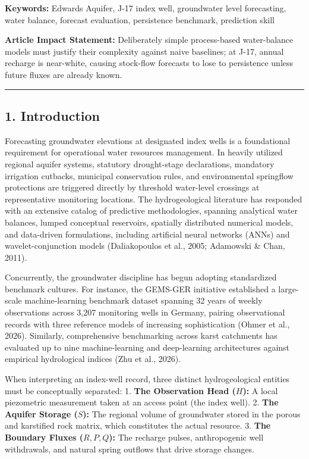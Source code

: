 \documentclass[11pt]{article}
\begin{document}
\textbf{Keywords:} Edwards Aquifer, J-17 index well, groundwater level
forecasting, water balance, forecast evaluation, persistence benchmark,
prediction skill

\textbf{Article Impact Statement:} Deliberately simple process-based
water-balance models must justify their complexity against naive
baselines; at J-17, annual recharge is near-white, causing stock-flow
forecasts to lose to persistence unless future fluxes are already known.

\begin{center}\rule{0.5\linewidth}{0.5pt}\end{center}

\subsection{1. Introduction}\label{introduction}

Forecasting groundwater elevations at designated index wells is a
foundational requirement for operational water resources management. In
heavily utilized regional aquifer systems, statutory drought-stage
declarations, mandatory irrigation cutbacks, municipal conservation
rules, and environmental springflow protections are triggered directly
by threshold water-level crossings at representative monitoring
locations. The hydrogeological literature has responded with an
extensive catalog of predictive methodologies, spanning analytical water
balances, lumped conceptual reservoirs, spatially distributed numerical
models, and data-driven formulations, including artificial neural
networks (ANNs) and wavelet-conjunction models (Daliakopoulos et al.,
2005; Adamowski \& Chan, 2011).

Concurrently, the groundwater discipline has begun adopting standardized
benchmark cultures. For instance, the GEMS-GER initiative established a
large-scale machine-learning benchmark dataset spanning 32 years of
weekly observations across 3,207 monitoring wells in Germany, pairing
observational records with three reference models of increasing
sophistication (Ohmer et al., 2026). Similarly, comprehensive
benchmarking across karst catchments has evaluated up to nine
machine-learning and deep-learning architectures against empirical
hydrological indices (Zhu et al., 2026).

When interpreting an index-well record, three distinct hydrogeological
entities must be conceptually separated: 1. \textbf{The Observation Head
(\(H\)):} A local piezometric measurement taken at an access point (the
index well). 2. \textbf{The Aquifer Storage (\(S\)):} The regional
volume of groundwater stored in the porous and karstified rock matrix,
which constitutes the actual resource. 3. \textbf{The Boundary Fluxes
(\(R, P, Q\)):} The recharge pulses, anthropogenic well withdrawals, and
natural spring outflows that drive storage changes.
\end{document}
